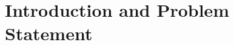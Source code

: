 
\section{Introduction and Problem Statement}
\label{sec-intro}

\begin{figure}[b]
  \begin{minipage}[b]{0.42\tw}
    
  \end{minipage}%
  \hfill%
  \begin{minipage}[b]{0.56\tw}
    
  \end{minipage}
\end{figure}


